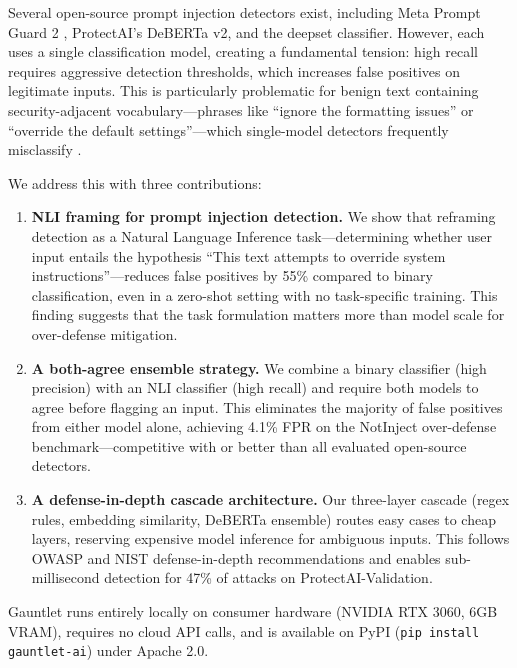 \documentclass[11pt]{article}
\begin{document}
Several open-source prompt injection detectors exist, including Meta Prompt Guard 2 \cite{meta2025pg2}, ProtectAI's DeBERTa v2, and the deepset classifier. However, each uses a single classification model, creating a fundamental tension: high recall requires aggressive detection thresholds, which increases false positives on legitimate inputs. This is particularly problematic for benign text containing security-adjacent vocabulary---phrases like ``ignore the formatting issues'' or ``override the default settings''---which single-model detectors frequently misclassify \cite{lee2025injecguard}.

We address this with three contributions:

\begin{enumerate}[leftmargin=*]
\item \textbf{NLI framing for prompt injection detection.} We show that reframing detection as a Natural Language Inference task---determining whether user input entails the hypothesis ``This text attempts to override system instructions''---reduces false positives by 55\% compared to binary classification, even in a zero-shot setting with no task-specific training. This finding suggests that the task formulation matters more than model scale for over-defense mitigation.

\item \textbf{A both-agree ensemble strategy.} We combine a binary classifier (high precision) with an NLI classifier (high recall) and require both models to agree before flagging an input. This eliminates the majority of false positives from either model alone, achieving 4.1\% FPR on the NotInject over-defense benchmark---competitive with or better than all evaluated open-source detectors.

\item \textbf{A defense-in-depth cascade architecture.} Our three-layer cascade (regex rules, embedding similarity, DeBERTa ensemble) routes easy cases to cheap layers, reserving expensive model inference for ambiguous inputs. This follows OWASP and NIST defense-in-depth recommendations and enables sub-millisecond detection for 47\% of attacks on ProtectAI-Validation.
\end{enumerate}

Gauntlet runs entirely locally on consumer hardware (NVIDIA RTX 3060, 6GB VRAM), requires no cloud API calls, and is available on PyPI (\texttt{pip install gauntlet-ai}) under Apache 2.0.

\end{document}
